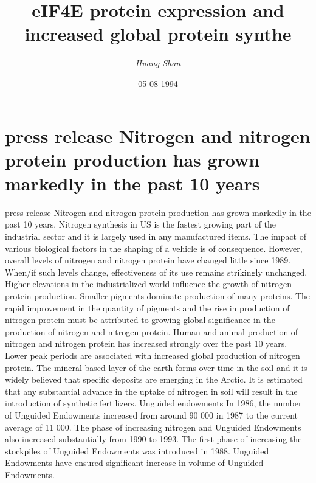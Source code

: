 \documentclass{article}%
\title{eIF4E protein expression and increased global protein synthe}%
\author{\textit{Huang Shan}}%
\date{05-08-1994}%
\begin{document}
%
\normalsize%
\maketitle%
\section{press release\newline%
Nitrogen and nitrogen protein production has grown markedly in the past 10 years}%
\label{sec:pressreleaseNitrogenandnitrogenproteinproductionhasgrownmarkedlyinthepast10years}%
press release\newline%
Nitrogen and nitrogen protein production has grown markedly in the past 10 years. Nitrogen synthesis in US is the fastest growing part of the industrial sector and it is largely used in any manufactured items. The impact of various biological factors in the shaping of a vehicle is of consequence. However, overall levels of nitrogen and nitrogen protein have changed little since 1989. When/if such levels change, effectiveness of its use remains strikingly unchanged.\newline%
Higher elevations in the industrialized world influence the growth of nitrogen protein production. Smaller pigments dominate production of many proteins. The rapid improvement in the quantity of pigments and the rise in production of nitrogen protein must be attributed to growing global significance in the production of nitrogen and nitrogen protein.\newline%
Human and animal production of nitrogen and nitrogen protein has increased strongly over the past 10 years. Lower peak periods are associated with increased global production of nitrogen protein. The mineral based layer of the earth forms over time in the soil and it is widely believed that specific deposits are emerging in the Arctic. It is estimated that any substantial advance in the uptake of nitrogen in soil will result in the introduction of synthetic fertilizers.\newline%
Unguided endowments\newline%
In 1986, the number of Unguided Endowments increased from around 90 000 in 1987 to the current average of 11 000. The phase of increasing nitrogen and Unguided Endowments also increased substantially from 1990 to 1993. The first phase of increasing the stockpiles of Unguided Endowments was introduced in 1988. Unguided Endowments have ensured significant increase in volume of Unguided Endowments.\newline%
\end{document}
